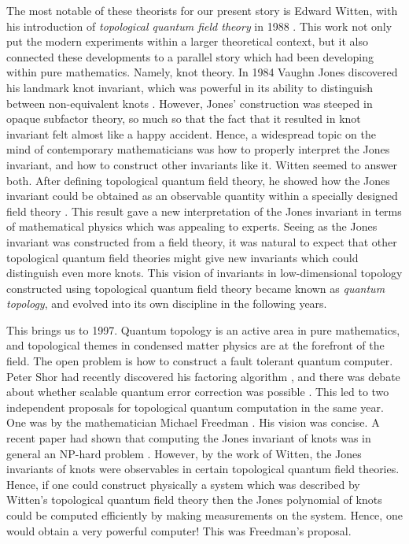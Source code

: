 The most notable of these theorists for our present story is Edward Witten, with his introduction of {\em topological quantum field theory} in 1988 \cite{witten1988topological}. This work not only put the modern experiments within a larger theoretical context, but it also connected these developments to a parallel story which had been developing within pure mathematics. Namely, knot theory. In 1984 Vaughn Jones discovered his landmark knot invariant, which was powerful in its ability to distinguish between non-equivalent knots \cite{jones1997polynomial}. However, Jones’ construction was steeped in opaque subfactor theory, so much so that the fact that it resulted in knot invariant felt almost like a happy accident. Hence, a widespread topic on the mind of contemporary mathematicians was how to properly interpret the Jones invariant, and how to construct other invariants like it. Witten seemed to answer both. After defining topological quantum field theory, he showed how the Jones invariant could be obtained as an observable quantity within a specially designed field theory \cite{witten1989quantum}. This result gave a new interpretation of the Jones invariant in terms of mathematical physics which was appealing to experts. Seeing as the Jones invariant was constructed from a field theory, it was natural to expect that other topological quantum field theories might give new invariants which could distinguish even more knots. This vision of invariants in low-dimensional topology constructed using topological quantum field theory became known as {\em quantum topology}, and evolved into its own discipline in the following years.

This brings us to 1997. Quantum topology is an active area in pure mathematics, and topological themes in condensed matter physics are at the forefront of the field. The open problem is how to construct a fault tolerant quantum computer. Peter Shor had recently discovered his factoring algorithm \cite{shor1994algorithms}, and there was debate about whether scalable quantum error correction was possible \cite{landauer1995quantum}. This led to two independent proposals for topological quantum computation in the same year. One was by the mathematician Michael Freedman \cite{freedman1998p}. His vision was concise. A recent paper had shown that computing the Jones invariant of knots was in general an NP-hard problem \cite{jaeger1990computational}. However, by the work of Witten, the Jones invariants of knots were observables in certain topological quantum field theories. Hence, if one could construct physically a system which was described by Witten’s topological quantum field theory then the Jones polynomial of knots could be computed efficiently by making measurements on the system. Hence, one would obtain a very powerful computer! This was Freedman’s proposal.

